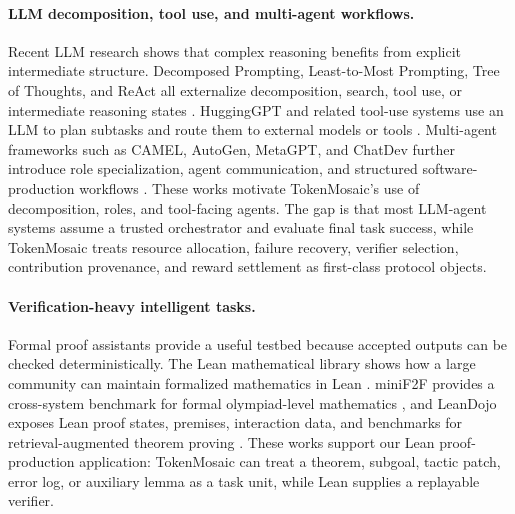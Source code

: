 \documentclass{article}
\theoremstyle{plain}
\begin{document}
\paragraph{LLM decomposition, tool use, and multi-agent workflows.}
Recent LLM research shows that complex reasoning benefits from explicit intermediate structure. Decomposed Prompting, Least-to-Most Prompting, Tree of Thoughts, and ReAct all externalize decomposition, search, tool use, or intermediate reasoning states \citep{khot2023decomposed,zhou2023least,yao2023tree,yao2023react}. HuggingGPT and related tool-use systems use an LLM to plan subtasks and route them to external models or tools \citep{shen2023hugginggpt}. Multi-agent frameworks such as CAMEL, AutoGen, MetaGPT, and ChatDev further introduce role specialization, agent communication, and structured software-production workflows \citep{li2023camel,wu2023autogen,hong2024metagpt,qian2023chatdev}. These works motivate TokenMosaic's use of decomposition, roles, and tool-facing agents. The gap is that most LLM-agent systems assume a trusted orchestrator and evaluate final task success, while TokenMosaic treats resource allocation, failure recovery, verifier selection, contribution provenance, and reward settlement as first-class protocol objects.

\paragraph{Verification-heavy intelligent tasks.}
Formal proof assistants provide a useful testbed because accepted outputs can be checked deterministically. The Lean mathematical library shows how a large community can maintain formalized mathematics in Lean \citep{mathlib2020}. miniF2F provides a cross-system benchmark for formal olympiad-level mathematics \citep{zheng2021minif2f}, and LeanDojo exposes Lean proof states, premises, interaction data, and benchmarks for retrieval-augmented theorem proving \citep{yang2023leandojo}. These works support our Lean proof-production application: TokenMosaic can treat a theorem, subgoal, tactic patch, error log, or auxiliary lemma as a task unit, while Lean supplies a replayable verifier.
\end{document}
